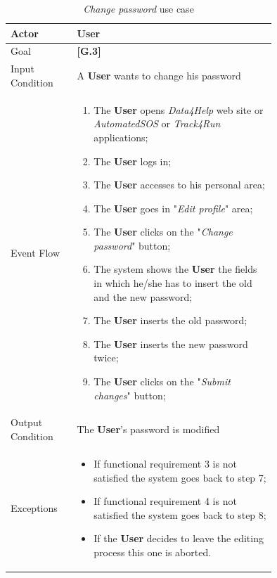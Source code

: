 \begin{center}
\begin{table}
\begin{tabular}{ | l | p{0.75\linewidth} | }
  \hline
    Actor & \textbf{User} \\ \hline
    Goal & \textbf{[G.3]} \\ \hline
    Input Condition & A \textbf{User} wants to change his password\\ \hline
    Event Flow & \begin{minipage}[t]{0.7\textwidth}
      \begin{enumerate}
        \item The \textbf{User} opens \textit{Data4Help} web site or \textit{AutomatedSOS} or \textit{Track4Run} applications;
        \item The \textbf{User} logs in;
        \item The \textbf{User} accesses to his personal area;
        \item The \textbf{User} goes in "\textit{Edit profile}" area;
        \item The \textbf{User} clicks on the "\textit{Change password}" button;
        \item The system shows the \textbf{User} the fields in which he/she has to insert the old and the new password;
        \item The \textbf{User} inserts the old password;
        \item The \textbf{User} inserts the new password twice;
        \item The \textbf{User} clicks on the "\textit{Submit changes}" button;
      \end{enumerate}
    \smallskip
  \end{minipage} \\ \hline
  Output Condition & The \textbf{User}'s password is modified\\ \hline
  Exceptions & \begin{minipage}[t]{0.7\textwidth}
    \begin{itemize}
      \smallskip
      \item If functional requirement 3 is not satisfied the system goes back to step 7;
      \item If functional requirement 4 is not satisfied the system goes back to step 8;
      \item If the \textbf{User} decides to leave the editing process this one is aborted.
    \end{itemize}
    \smallskip
  \end{minipage}  \\ \hline
\end{tabular}
\caption{\textit{Change password} use case}
\label{table:changePassowrdTable}
\end{table}
\end{center}

